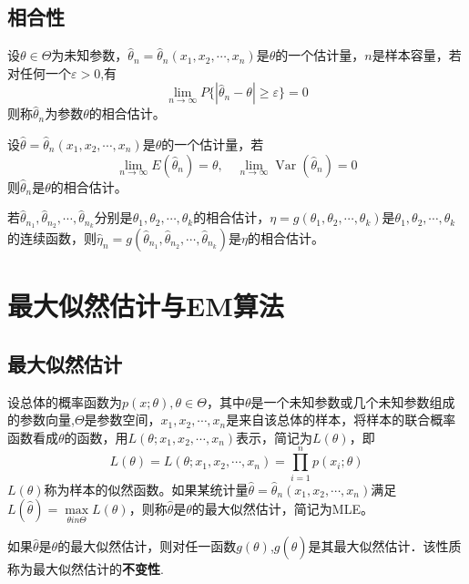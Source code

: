 \subsection{相合性}
\begin{definition}
    设$\theta \in \Theta$为未知参数，$\hat{\theta}_n =\hat{\theta}_n(x_1, x_2, \cdots, x_n) $是$\theta$的一个估计量，$n$是样本容量，若对任何一个$\varepsilon > 0 $,有$$
        \lim_{n \to \infty} P\{|\hat{\theta}_n - \theta| \geq \varepsilon \} = 0
    $$
    则称$\hat{\theta}_n$为参数$\theta$的相合估计。
\end{definition}

\begin{theorem}
    设$\hat{\theta}=\hat{\theta}_n(x_1, x_2, \cdots, x_n)$是$\theta$的一个估计量，若
    $$
        \lim_{n \to \infty} E(\hat{\theta}_n) = \theta, \quad
        \lim_{n \to \infty} \operatorname{Var}(\hat{\theta}_n) = 0
    $$
    则$\hat{\theta}_n$是$\theta$的相合估计。
\end{theorem}
\begin{theorem}
    若$\hat{\theta}_{n_1},\hat{\theta}_{n_2},\cdots,\hat{\theta}_{n_k}$分别是$\theta_1 ,\theta_2,\cdots,\theta_k$的相合估计，$\eta=g(\theta_1 ,\theta_2,\cdots,\theta_k)$是$\theta_1 ,\theta_2,\cdots,\theta_k$的连续函数，则$\hat{\eta}_n=g(\hat{\theta}_{n_1},\hat{\theta}_{n_2},\cdots,\hat{\theta}_{n_k})$是$\eta$的相合估计。
\end{theorem}

\section{最大似然估计与EM算法}
\subsection{最大似然估计}
\begin{definition}
    设总体的概率函数为$p(x;\theta),\theta \in \Theta$，其中$\theta$是一个未知参数或几个未知参数组成的参数向量,$\Theta$是参数空间，$x_1 ,x_2 ,\cdots,x_n$是来自该总体的样本，将样本的联合概率函数看成$\theta$的函数，用$L(\theta;x_1 ,x_2 ,\cdots,x_n)$表示，简记为$L(\theta)$，即
    $$
        L(\theta) = L(\theta;x_1 ,x_2 ,\cdots,x_n) = \prod_{i=1}^n p(x_i;\theta)
    $$
    $L(\theta)$称为样本的似然函数。如果某统计量$\hat{\theta}=\hat{\theta}_n(x_1, x_2, \cdots, x_n)$满足$L(\hat{\theta})=\max\limits_{\theta in \Theta}L(\theta)$，则称$\hat{\theta}$是$\theta$的最大似然估计，简记为MLE。
\end{definition}
如果$\hat{\theta}$是$\theta$的最大似然估计，则对任一函数$g(\theta)$,$g(\hat{\theta})$是其最大似然估计．该性质称为最大似然估计的\textbf{不变性}.


